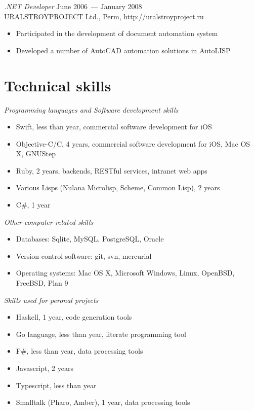 \documentclass[12pt]{res}
\begin{document}
\begin{resume}
{\sl .NET Developer} \hfill June 2006~--- January 2008 \\
URALSTROYPROJECT Ltd., Perm, http://uralstroyproject.ru
\begin{itemize}
\item Participated in the development of document automation system
\item Developed a number of AutoCAD automation solutions in AutoLISP
\end{itemize}

\section{Technical skills} 

{\sl Programming languages and Software development skills} 
\begin{itemize}
\item Swift, less than year, commercial software development for iOS
\item Objective-C/C, 4 years, commercial software development for iOS, Mac OS X, GNUStep
\item Ruby, 2 years, backends, RESTful services, intranet web apps
\item Various Lisps (Nulana Microlisp, Scheme, Common Lisp), 2 years
\item C\#, 1 year
\end{itemize}

{\sl Other computer-related skills}
\begin{itemize}
\item Databases: Sqlite, MySQL, PostgreSQL, Oracle
\item Version control software: git, svn, mercurial
\item Operating systems: Mac OS X, Microsoft Windows, Linux, OpenBSD, FreeBSD, Plan 9
\end{itemize} 

{\sl Skills used for peronal projects}
\begin{itemize}
\item Haskell, 1 year, code generation tools
\item Go language, less than year, literate programming tool
\item F\#, less than year, data processing tools
\item Javascript, 2 years
\item Typescript, less than year
\item Smalltalk (Pharo, Amber), 1 year, data processing tools
\end{itemize}


\end{resume}
\end{document}
